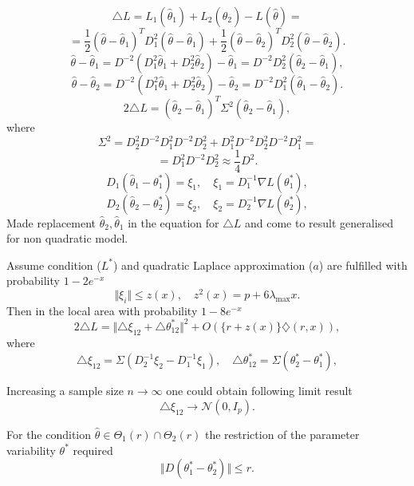 \[
\triangle L =
L_1(\widehat{\theta}_1) + L_2(\widehat{\theta}_2) -  L(\widehat{\theta}) = 
\]
\[
=   \frac{1}{2} (\widehat{\theta} - \widehat{\theta}_1)^T D_1^2  (\widehat{\theta} - \widehat{\theta}_1)
+ \frac{1}{2} (\widehat{\theta} - \widehat{\theta}_2)^T D_2^2  (\widehat{\theta} - \widehat{\theta}_2).
\]
\[
\widehat{\theta} - \widehat{\theta}_1 = D^{-2} (D_1^2 \widehat{\theta}_1 + D_2^2 \widehat{\theta}_2 ) - \widehat{\theta}_1 = D^{-2} D_2^2 ( \widehat{\theta}_2 -  \widehat{\theta}_1),
\]
\[
\widehat{\theta} - \widehat{\theta}_2 = D^{-2} (D_1^2 \widehat{\theta}_1 + D_2^2 \widehat{\theta}_2 ) - \widehat{\theta}_2 = D^{-2} D_1^2 ( \widehat{\theta}_1 -  \widehat{\theta}_2).
\]
\[
2 \triangle L =  ( \widehat{\theta}_2 -  \widehat{\theta}_1)^T \Sigma^2 ( \widehat{\theta}_2 -  \widehat{\theta}_1),
\]
where
\[
\Sigma^2 = D_2^2 D^{-2} D_1^2 D^{-2} D_2^2 + D_1^2 D^{-2} D_2^2 D^{-2} D_1^2=
\]
\[\tag{S}
 = D_1^2 D^{-2}D_2^2 \approx \frac{1}{4} D^2. 
\]
\[
 D_1(\widehat{\theta}_1 - \theta_1^*) = \xi_1,
\quad
\xi_1 = D_1^{-1} \nabla L(\theta_1^*),
\]
\[
D_2(\widehat{\theta}_2 - \theta_2^*) = \xi_2,
\quad
\xi_2 = D_2^{-1} \nabla L(\theta_2^*),
\]
Made replacement $\widehat{\theta}_2,  \widehat{\theta}_1$ in the equation for $\triangle L$ and 
come to result generalised for non quadratic model. 

\begin{theorem}
\label{dl_theorem}
Assume condition ($L^*$) and quadratic Laplace approximation ($a$)   are fulfilled with probability $1 - 2 e^{-x}$
\[
\Vert \xi_i \Vert \leq z(x), 
\quad z^2(x) = p + 6 \lambda_{\max} x.
\] 
Then in the local area with probability $1 - 8 e^{-x}$ 
\[
2 \triangle L = \Vert \triangle \xi_{12} + \triangle \theta_{12}^*\Vert^2  + O(\{r + z(x)\} \diamondsuit (r, x)),
\]
where
\[
\triangle \xi_{12}  = \Sigma (D_2^{-1} \xi_2 - D_1^{-1} \xi_1),
\quad
\triangle \theta_{12}^*  = \Sigma (\theta_2^* - \theta_1^*), 
\]
\end{theorem}    

\begin{remark} Increasing a sample size $n \to \infty$ one could obtain following limit result  
\[
\triangle \xi_{12} \to \mathcal{N}(0, I_p).
\]
\end{remark}

\begin{remark}
For the condition $\widehat{\theta} \in \Theta_1(r) \cap \Theta_2(r)$ the restriction of the parameter variability $\theta^*$ required
\[\tag{L*}
\Vert D(\theta_1^* - \theta_2^*) \Vert \leq r.
\]  
\end{remark}

